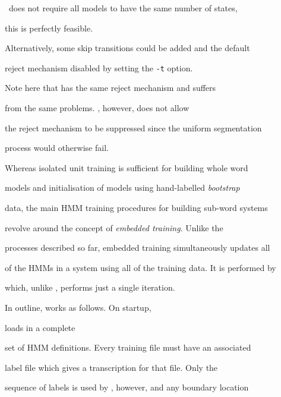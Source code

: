 \HTK\ does not require all models to have the same number of states,


this is perfectly feasible.


Alternatively, some skip transitions could be added and the default


reject mechanism disabled by setting the \texttt{-t} option.


Note here that  has the same reject mechanism and suffers


from the same problems.  , however, does not allow


the reject mechanism to be suppressed since the uniform segmentation


process would otherwise fail.












Whereas isolated unit training is sufficient for  building whole  word


models and initialisation of models using hand-labelled \textit{bootstrap}


data,  the main HMM training procedures for building sub-word systems


revolve around the  concept of \textit{embedded training}. Unlike the


processes described so far,  embedded training simultaneously updates all


of the HMMs in a system using all of the training data.  It is performed by


 which, unlike , performs just a single iteration.  







In outline,  works as follows.  On startup,  


loads in a complete


set of HMM definitions.  Every training file must have an associated


label file which gives a transcription for that file.  Only the


sequence of labels is used by , however, and any boundary location


